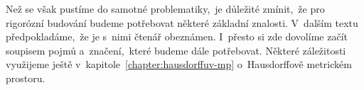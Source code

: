 Než se však pustíme do samotné problematiky,~je důležité zmínit,~že pro rigorózní budování budeme potřebovat některé základní znalosti. V~dalším textu předpokladáme,~že je s~nimi čtenář obeznámen. I~přesto si zde dovolíme začít soupisem pojmů a~značení,~které budeme dále potřebovat. Některé záležitosti využijeme ještě v~kapitole~\ref{chapter:hausdorffuv-mp} o~Hausdorffově metrickém prostoru.






